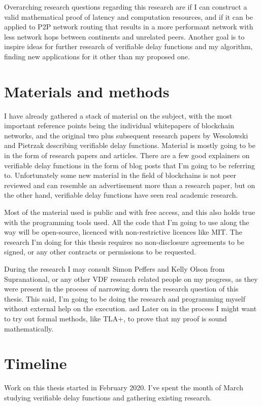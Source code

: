 \documentclass[a4paper,12pt]{article}
\begin{document}
Overarching research questions regarding this research are if I can construct a valid mathematical proof of latency and computation resources, and if it can be applied to P2P network routing that results in a more performant network with less network hops between continents and unrelated peers. Another goal is to inspire ideas for further research of verifiable delay functions and my algorithm, finding new applications for it other than my proposed one.

\section{Materials and methods}
I have already gathered a stack of material on the subject, with the most important reference points being the individual whitepapers of blockchain networks, and the original two plus subsequent research papers by Wesolowski and Pietrzak describing verifiable delay functions. Material is mostly going to be in the form of research papers and articles. There are a few good explainers on verifiable delay functions in the form of blog posts that I'm going to be referring to. Unfortunately some new material in the field of blockchains is not peer reviewed and can resemble an advertisement more than a research paper, but on the other hand, verifiable delay functions have seen real academic research.

Most of the material used is public and with free access, and this also holds true with the programming tools used. All the code that I'm going to use along the way will be open-source, licenced with non-restrictive licences like MIT. The research I'm doing for this thesis requires no non-disclosure agreements to be signed, or any other contracts or permissions to be requested.

During the research I may consult Simon Peffers and Kelly Olson from Supranational, or any other VDF research related people on my progress, as they were present in the process of narrowing down the research question of this thesis. This said, I'm going to be doing the research and programming myself without external help on the execution.
asd
Later on in the process I might want to try out formal methods, like TLA+, to prove that my proof is sound mathematically.

\section{Timeline}
Work on this thesis started in February 2020. I've spent the month of March studying verifiable delay functions and gathering existing research.
\end{document}
